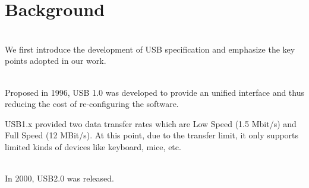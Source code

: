 \section{Background}
\label{sec:background}
\noindent{}\\
We first introduce the development of USB specification and emphasize the key points adopted in our work.

\noindent{}\\
Proposed in 1996, USB 1.0\cite{usb10} was developed to provide an unified interface and thus reducing the cost of re-configuring the software.

USB1.x\cite{usb10}\cite{usb11} provided two data transfer rates which are Low Speed (1.5 Mbit/s) and Full Speed (12 MBit/s). At this point, due to the transfer limit, it only supports limited kinds of devices like keyboard, mice, etc.

\noindent{}\\
In 2000, USB2.0\cite{usb20} was released.
\\
\\
\\